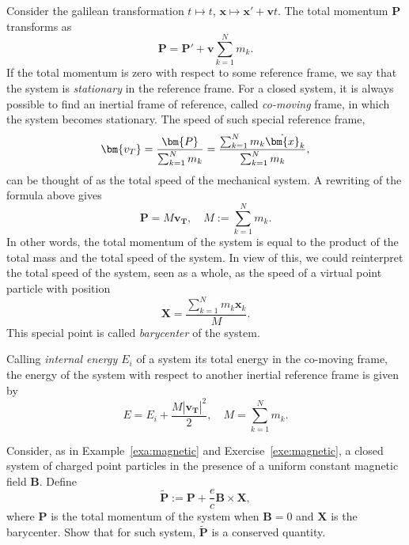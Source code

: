 \documentclass[english,fontsize=11pt,paper=a5,oneside]{scrbook}
\newcommand{\bx}{\bm{x}}
\theoremstyle{definition}
\newenvironment{example}
  {\pushQED{\qed}\renewcommand{\qedsymbol}{$\lozenge$}\examplex}
  {\popQED\endexamplex}
\newenvironment{exercise}
  {\pushQED{\qed}\renewcommand{\qedsymbol}{$\maltese$}\exercisex}
  {\popQED\endexercisex}
\begin{document}
\begin{example}[The baricenter]
    Consider the galilean transformation $t \mapsto t$, $\bx \mapsto \bx' + \bm{v}t$.
    The total momentum $\bm{P}$ transforms as
    \begin{equation}
        \bm{P} = \bm{P}' + \bm{v}  \sum_{k=1}^N m_k.
    \end{equation}
    If the total momentum is zero with respect to some reference frame, we say that the system is \emph{stationary} in the reference frame. For a closed system, it is always possible to find an inertial frame of reference, called \emph{co-moving} frame, in which the system becomes stationary. The speed of such special reference frame,
    \begin{equation}
        \bm{v_T} = \frac{\bm{P}}{\sum_{k=1}^N m_k}
               = \frac{\sum_{k=1}^N m_k \dot \bx_k}{\sum_{k=1}^N m_k},
    \end{equation}
    can be thought of as the total speed of the mechanical system.
    A rewriting of the formula above gives
    \begin{equation}
        \bm{P} = M \bm{v_T}, \quad M:= \sum_{k=1}^N m_k.
    \end{equation}
    In other words, the total momentum of the system is equal to the product of the total mass and the total speed of the system.
    In view of this, we could reinterpret the total speed of the system, seen as a whole, as the speed of a virtual point particle with position
    \begin{equation}
        \bm{X} = \frac{\sum_{k=1}^N m_k \bx_k}{M}.
    \end{equation}
    This special point is called \emph{barycenter} of the system.
    \medskip

    Calling \emph{internal energy $E_i$} of a system its total energy in the co-moving frame, the energy of the system with respect to another inertial reference frame is given by
    \begin{equation}
        E = E_i + \frac{M |\bm{v_T}|^2}{2}, \quad M= \sum_{k=1}^N m_k.
    \end{equation}
\end{example}

\begin{exercise}
    Consider, as in Example~\ref{exa:magnetic} and Exercise~\ref{exe:magnetic}, a closed system of charged point particles in the presence of a uniform constant magnetic field $\bm{B}$. Define
    \begin{equation}
        \widetilde{\bm{P}} := \bm{P} + \frac{e}c \bm{B}\times \bm{X},
    \end{equation}
    where $\bm{P}$ is the total momentum of the system when $\bm{B} = 0$ and $\bm{X}$ is the barycenter.
    Show that for such system, $\widetilde{\bm{P}}$ is a conserved quantity.
\end{exercise}
\end{document}
